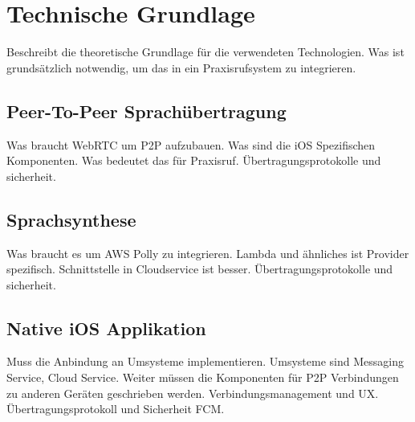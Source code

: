 
\section{Technische Grundlage}

Beschreibt die theoretische Grundlage für die verwendeten Technologien.
Was ist grundsätzlich notwendig, um das in ein Praxisrufsystem zu integrieren.

\subsection{Peer-To-Peer Sprachübertragung}

Was braucht WebRTC um P2P aufzubauen.
Was sind die iOS Spezifischen Komponenten.
Was bedeutet das für Praxisruf.
Übertragungsprotokolle und sicherheit.

\subsection{Sprachsynthese}

Was braucht es um AWS Polly zu integrieren.
Lambda und ähnliches ist Provider spezifisch.
Schnittstelle in Cloudservice ist besser.
Übertragungsprotokolle und sicherheit.

\subsection{Native iOS Applikation}

Muss die Anbindung an Umsysteme implementieren.
Umsysteme sind Messaging Service, Cloud Service.
Weiter müssen die Komponenten für P2P Verbindungen zu anderen Geräten geschrieben werden.
Verbindungsmanagement und UX.
Übertragungsprotokoll und Sicherheit FCM.

\clearpage

